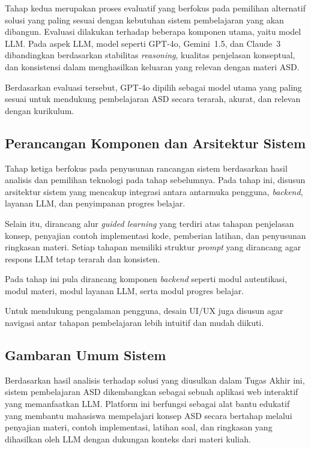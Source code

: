Tahap kedua merupakan proses evaluatif yang berfokus pada pemilihan alternatif solusi yang paling sesuai dengan kebutuhan sistem pembelajaran yang akan dibangun. Evaluasi dilakukan terhadap beberapa komponen utama, yaitu model LLM. Pada aspek LLM, model seperti GPT-4o, Gemini~1.5, dan Claude~3 dibandingkan berdasarkan stabilitas \textit{reasoning}, kualitas penjelasan konseptual, dan konsistensi dalam menghasilkan keluaran yang relevan dengan materi ASD.

Berdasarkan evaluasi tersebut, GPT-4o dipilih sebagai model utama yang paling sesuai untuk mendukung pembelajaran ASD secara terarah, akurat, dan relevan dengan kurikulum.


\subsection{Perancangan Komponen dan Arsitektur Sistem}

Tahap ketiga berfokus pada penyusunan rancangan sistem berdasarkan hasil 
analisis dan pemilihan teknologi pada tahap sebelumnya. Pada tahap ini, 
disusun arsitektur sistem yang mencakup integrasi antara antarmuka pengguna,
\textit{backend}, layanan LLM, dan penyimpanan progres belajar.

Selain itu, dirancang alur \textit{guided learning} yang terdiri atas tahapan 
penjelasan konsep, penyajian contoh implementasi kode, pemberian latihan, dan 
penyusunan ringkasan materi. Setiap tahapan memiliki struktur \textit{prompt} 
yang dirancang agar respons LLM tetap terarah dan konsisten.

Pada tahap ini pula dirancang komponen
\textit{backend} seperti modul autentikasi, modul materi, modul layanan LLM,
serta modul progres belajar.

Untuk mendukung pengalaman pengguna, desain UI/UX juga disusun agar navigasi 
antar tahapan pembelajaran lebih intuitif dan mudah diikuti.

\subsection{Gambaran Umum Sistem}

Berdasarkan hasil analisis terhadap solusi yang diusulkan dalam Tugas Akhir ini, 
sistem pembelajaran ASD dikembangkan sebagai sebuah aplikasi web interaktif 
yang memanfaatkan LLM. Platform ini berfungsi sebagai alat bantu edukatif yang membantu 
mahasiswa mempelajari konsep ASD secara bertahap melalui penyajian materi, 
contoh implementasi, latihan soal, dan ringkasan yang dihasilkan oleh LLM 
dengan dukungan konteks dari materi kuliah.

